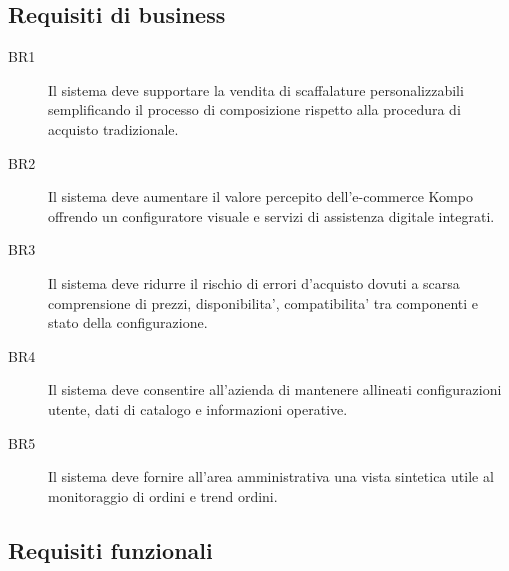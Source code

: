 \subsection{Requisiti di business}

\begin{description}
	\item[BR1] Il sistema deve supportare la vendita di scaffalature personalizzabili semplificando il processo di composizione rispetto alla procedura di acquisto tradizionale.
	\item[BR2] Il sistema deve aumentare il valore percepito dell'e-commerce Kompo offrendo un configuratore visuale e servizi di assistenza digitale integrati.
	\item[BR3] Il sistema deve ridurre il rischio di errori d'acquisto dovuti a scarsa comprensione di prezzi, disponibilita', compatibilita' tra componenti e stato della configurazione.
	\item[BR4] Il sistema deve consentire all'azienda di mantenere allineati configurazioni utente, dati di catalogo e informazioni operative.
	\item[BR5] Il sistema deve fornire all'area amministrativa una vista sintetica utile al monitoraggio di ordini e trend ordini.
\end{description}

\subsection{Requisiti funzionali}

